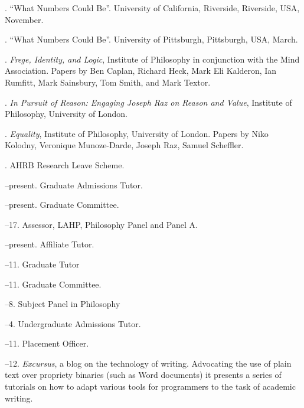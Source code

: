 \documentclass[11pt]{article}
\begin{document}
. ``What Numbers Could Be''. University of California, Riverside, Riverside, USA, November.

. ``What Numbers Could Be''. University of Pittsburgh, Pittsburgh, USA, March.



\bigskip

\medskip

. \emph{Frege, Identity, and Logic}, Institute of Philosophy in conjunction with the Mind Association. Papers by Ben Caplan, Richard Heck, Mark Eli Kalderon, Ian Rumfitt, Mark Sainsbury, Tom Smith, and Mark Textor.

. \emph{In Pursuit of Reason: Engaging Joseph Raz on Reason and Value}, Institute of Philosophy, University of London.

. \emph{Equality}, Institute of Philosophy, University of London. Papers by Niko Kolodny, Veronique Munoze-Darde, Joseph Raz, Samuel Scheffler.

\bigskip

\medskip
  
. AHRB Research Leave Scheme.

\bigskip 

\medskip

--present. Graduate Admissions Tutor.

--present. Graduate Committee.

--17. Assessor, LAHP, Philosophy Panel and Panel A.

--present. Affiliate Tutor.

--11. Graduate Tutor

--11. Graduate Committee.

--8. Subject Panel in Philosophy

--4. Undergraduate Admissions Tutor.

--11. Placement Officer.

\bigskip

\medskip

--12. \emph{Excursus}, a blog on the technology of writing. Advocating the use of plain text over propriety binaries (such as Word documents) it presents a series of tutorials on how to adapt various tools for programmers to the task of academic writing.
\end{document}
